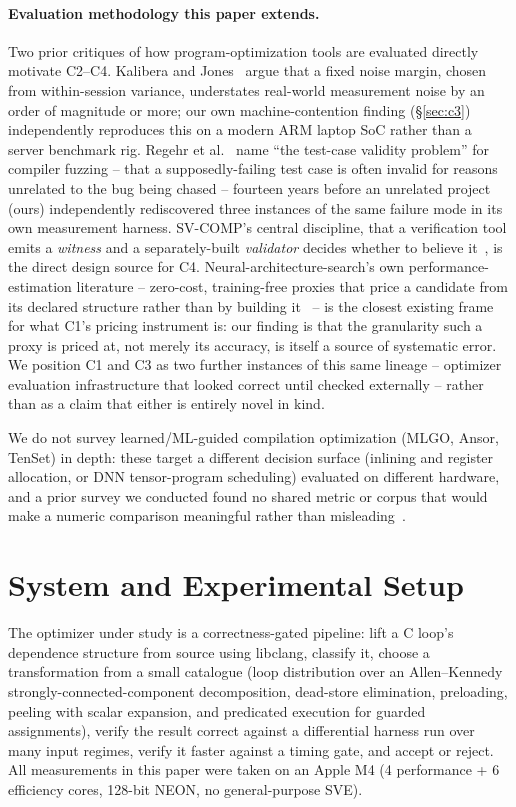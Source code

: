 \documentclass[sigconf,review,anonymous]{acmart}
\begin{document}
\paragraph{Evaluation methodology this paper extends.}
Two prior critiques of how program-optimization tools are evaluated
directly motivate C2--C4. Kalibera and Jones~\cite{kalibera-jones} argue
that a fixed noise margin, chosen from within-session variance, understates
real-world measurement noise by an order of magnitude or more; our own
machine-contention finding (\S\ref{sec:c3}) independently reproduces this on
a modern ARM laptop SoC rather than a server benchmark rig. Regehr et
al.~\cite{creduce} name ``the test-case validity problem'' for compiler
fuzzing -- that a supposedly-failing test case is often invalid for reasons
unrelated to the bug being chased -- fourteen years before an unrelated
project (ours) independently rediscovered three instances of the same
failure mode in its own measurement harness. SV-COMP's central discipline,
that a verification tool emits a \emph{witness} and a separately-built
\emph{validator} decides whether to believe it~\cite{svcomp-witnesses}, is
the direct design source for C4. Neural-architecture-search's own
performance-estimation literature -- zero-cost, training-free proxies that
price a candidate from its declared structure rather than by building
it~\cite{nas-survey} -- is the closest existing frame for what C1's pricing
instrument is: our finding is that the granularity such a proxy is priced
at, not merely its accuracy, is itself a source of systematic error. We
position C1 and C3 as two further instances of this same lineage --
optimizer evaluation infrastructure that looked correct until checked
externally -- rather than as a claim that either is entirely novel in kind.

We do not survey learned/ML-guided compilation optimization (MLGO, Ansor,
TenSet) in depth: these target a different decision surface (inlining and
register allocation, or DNN tensor-program scheduling) evaluated on
different hardware, and a prior survey we conducted found no shared metric
or corpus that would make a numeric comparison meaningful rather than
misleading~\cite{mlgo,ansor,tenset}.

\section{System and Experimental Setup}
\label{sec:setup}

The optimizer under study is a correctness-gated pipeline: lift a C loop's
dependence structure from source using libclang, classify it, choose a
transformation from a small catalogue (loop distribution over an
Allen--Kennedy strongly-connected-component decomposition, dead-store
elimination, preloading, peeling with scalar expansion, and predicated
execution for guarded assignments), verify the result correct against a
differential harness run over many input regimes, verify it faster against a
timing gate, and accept or reject. All measurements in this paper were taken
on an Apple M4 (4 performance + 6 efficiency cores, 128-bit NEON, no
general-purpose SVE).
\end{document}
